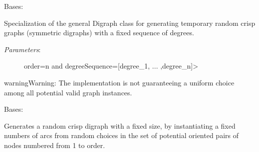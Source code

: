 \documentclass[letterpaper,10pt,english]{sphinxmanual}
\begin{document}
\begin{fulllineitems}
\label{techDoc:randomDigraphs.RandomFixedDegreeSequenceDigraph}
Bases: {\hyperref[techDoc:digraphs.Digraph]{\emph{}}}

Specialization of the general Digraph class for generating
temporary random crisp graphs (symmetric digraphs) with a fixed sequence of degrees.
\begin{description}
\item[{\emph{Parameters}:}] \leavevmode
order=n and degreeSequence={[}degree\_1, ... ,degree\_n{]}\textgreater{}

\end{description}

\begin{notice}{warning}{Warning:}
The implementation is not guaranteeing a uniform choice among all potential valid graph instances.
\end{notice}

\end{fulllineitems}


\begin{fulllineitems}
\label{techDoc:randomDigraphs.RandomFixedSizeDigraph}
Bases: {\hyperref[techDoc:digraphs.Digraph]{\emph{}}}

Generates a random crisp digraph with a fixed size, by instantiating a fixed numbers of arcs
from random choices in the set of potential oriented pairs of nodes numbered from 1 to order.

\end{fulllineitems}

\end{document}
